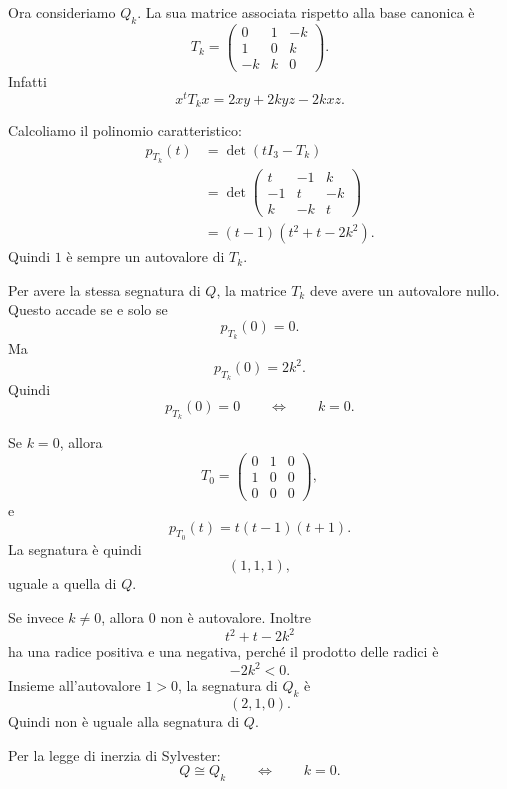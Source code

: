 \documentclass[a4paper]{article}
\begin{document}
\begin{snippetsolution}{}
    Ora consideriamo \(Q_k\). La sua matrice associata rispetto alla base canonica è
    \[
        T_k=
        \begin{pmatrix}
            0 & 1 & -k\\
            1 & 0 & k\\
            -k & k & 0
        \end{pmatrix}.
    \]
    Infatti
    \[
        x^tT_kx
        =
        2xy+2kyz-2kxz.
    \]

    Calcoliamo il polinomio caratteristico:
    \begin{align*}
        p_{T_k}(t)
        &=
        \det(tI_3-T_k)\\
        &=
        \det
        \begin{pmatrix}
            t & -1 & k\\
            -1 & t & -k\\
            k & -k & t
        \end{pmatrix}\\
        &=
        (t-1)(t^2+t-2k^2).
    \end{align*}
    Quindi \(1\) è sempre un autovalore di \(T_k\).

    Per avere la stessa segnatura di \(Q\), la matrice \(T_k\) deve avere un autovalore nullo. Questo accade se e solo se
    \[
        p_{T_k}(0)=0.
    \]
    Ma
    \[
        p_{T_k}(0)=2k^2.
    \]
    Quindi
    \[
        p_{T_k}(0)=0
        \qquad
        \Longleftrightarrow
        \qquad
        k=0.
    \]

    Se \(k=0\), allora
    \[
        T_0=
        \begin{pmatrix}
            0 & 1 & 0\\
            1 & 0 & 0\\
            0 & 0 & 0
        \end{pmatrix},
    \]
    e
    \[
        p_{T_0}(t)=t(t-1)(t+1).
    \]
    La segnatura è quindi
    \[
        (1,1,1),
    \]
    uguale a quella di \(Q\).

    Se invece \(k\neq 0\), allora \(0\) non è autovalore. Inoltre
    \[
        t^2+t-2k^2
    \]
    ha una radice positiva e una negativa, perché il prodotto delle radici è
    \[
        -2k^2<0.
    \]
    Insieme all'autovalore \(1>0\), la segnatura di \(Q_k\) è
    \[
        (2,1,0).
    \]
    Quindi non è uguale alla segnatura di \(Q\).

    Per la legge di inerzia di Sylvester:
    \[
        Q\cong Q_k
        \qquad
        \Longleftrightarrow
        \qquad
        k=0.
    \]
\end{snippetsolution}
\end{document}
